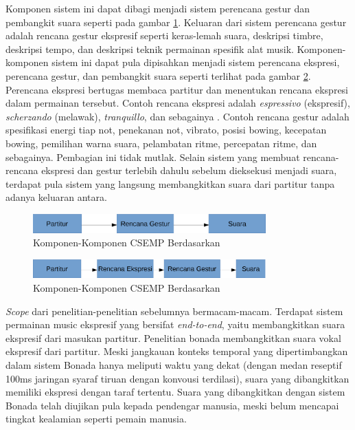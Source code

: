 Komponen sistem ini dapat dibagi menjadi sistem perencana gestur dan pembangkit suara \parencite{Thippur2013ProbabilisticMO} seperti pada gambar \ref{thippurcomponents}. Keluaran dari sistem perencana gestur adalah rencana gestur ekspresif seperti keras-lemah suara, deskripsi timbre, deskripsi tempo, dan deskripsi teknik permainan spesifik alat musik. Komponen-komponen sistem ini dapat pula dipisahkan menjadi sistem perencana ekspresi, perencana gestur, dan pembangkit suara \parencite{yu2017bowing} seperti terlihat pada gambar \ref{yucomponents}. Perencana ekspresi bertugas membaca partitur dan menentukan rencana ekspresi dalam permainan tersebut. Contoh rencana ekspresi adalah \textit{espressivo} (ekspresif), \textit{scherzando} (melawak), \textit{tranquillo}, dan sebagainya \parencite{yang2016synthesis}. Contoh rencana gestur adalah spesifikasi energi tiap not, penekanan not, vibrato, posisi bowing, kecepatan bowing, pemilihan warna suara, pelambatan ritme, percepatan ritme, dan sebagainya. Pembagian ini tidak mutlak. Selain sistem yang membuat rencana-rencana ekspresi dan gestur terlebih dahulu sebelum dieksekusi menjadi suara, terdapat pula sistem yang langsung membangkitkan suara dari partitur tanpa adanya keluaran antara.

\begin{figure}[h]
    \centering
    \includegraphics[width=0.8\textwidth]{resources/CSEMP-Components-Thippur.eps}
    \caption{Komponen-Komponen CSEMP Berdasarkan \parencite{Thippur2013ProbabilisticMO}} \label{thippurcomponents}
\end{figure}

\begin{figure}[h]
    \centering
    \includegraphics[width=0.8\textwidth]{resources/CSEMP-Components-Yu.eps}
    \caption{Komponen-Komponen CSEMP Berdasarkan \parencite{yu2017bowing}}\label{yucomponents}
\end{figure}

\textit{Scope} dari penelitian-penelitian sebelumnya bermacam-macam. Terdapat sistem permainan music ekspresif yang bersifat \textit{end-to-end}, yaitu membangkitkan suara ekspresif dari masukan partitur. Penelitian bonada \parencite{bonada2017singing} membangkitkan suara vokal ekspresif dari partitur. Meski jangkauan konteks temporal yang dipertimbangkan dalam sistem Bonada hanya meliputi waktu yang dekat (dengan medan reseptif 100ms jaringan syaraf tiruan dengan konvousi terdilasi), suara yang dibangkitkan memiliki ekspresi dengan taraf tertentu. Suara yang dibangkitkan dengan sistem Bonada telah diujikan pula kepada pendengar manusia, meski belum mencapai tingkat kealamian seperti pemain manusia.


